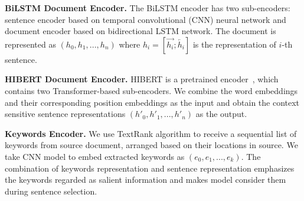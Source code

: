 \textbf{BiLSTM Document Encoder.}
The BiLSTM encoder has two sub-encoders: sentence encoder based on temporal convolutional (CNN) 
neural network and document encoder based on bidirectional LSTM network. 
The document is represented as $(h_0, h_1,...,h_n)$ where $h_i = [\overrightarrow{h_i};\overleftarrow{h_i}]$ is the representation of $i$-th sentence.

\textbf{HIBERT Document Encoder.}
%
HIBERT is a pretrained encoder~\cite{HiBert19},
which contains two Transformer-based sub-encoders.
We combine the word embeddings and their corresponding position embeddings as the input and obtain the context sensitive sentence
representations $(h'_0, h'_1,...,h'_n)$ as the output.

\textbf{Keywords Encoder.} 
We use TextRank algorithm to 
receive a sequential list of keywords from source document, 
arranged based on their locations in source. 
We take CNN model to embed extracted keywords as $(e_0, e_1, ..., e_k)$.
The combination of keywords representation and sentence representation
emphasizes the keywords regarded as salient information
and makes model consider them during sentence selection.

